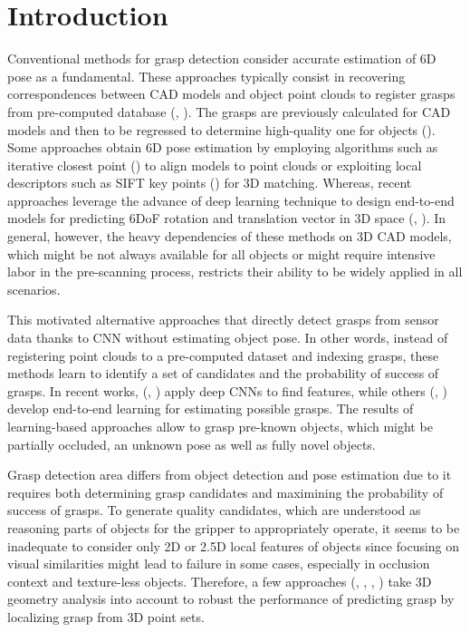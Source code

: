 \section{Introduction}
\label{sec:intro}
Conventional methods for grasp detection consider accurate estimation of 6D pose as a fundamental. These approaches typically consist in recovering correspondences between CAD models and object point clouds to register grasps from pre-computed database (\textcolor{cyan}{\cite{munoz2016fast}}, \textcolor{cyan}{\cite{zeng2017multi}}). The grasps are previously calculated for CAD models and then to be regressed to determine high-quality one for objects (\textcolor{cyan}{\cite{bohg2013data}}). Some approaches obtain 6D pose estimation by employing algorithms such as iterative closest point (\textcolor{cyan}{\cite{besl1992method}}) to align models to point clouds or exploiting local descriptors such as SIFT key points (\textcolor{cyan}{\cite{dias2014sift}}) for 3D matching. Whereas, recent approaches leverage the advance of deep learning technique to design end-to-end models for predicting 6DoF rotation and translation vector in 3D space (\textcolor{cyan}{\cite{wu20196d}}, \textcolor{cyan}{\cite{wang2019densefusion}}). In general, however, the heavy dependencies of these methods on 3D CAD models, which might be not always available for all objects or might require intensive labor in the pre-scanning process, restricts their ability to be widely applied in all scenarios.

This motivated alternative approaches that directly detect grasps from sensor data thanks to CNN without estimating object pose. In other words, instead of registering point clouds to a pre-computed dataset and indexing grasps, these methods learn to identify a set of candidates and the probability of success of grasps. In recent works, (\textcolor{cyan}{\cite{mahler2017dex}}, \textcolor{cyan}{\cite{mahler2018dex}}) apply deep CNNs to find features, while others (\textcolor{cyan}{\cite{redmon2015real}}, \textcolor{cyan}{\cite{lenz2015deep}}) develop end-to-end learning for estimating possible grasps. The results of learning-based approaches allow to grasp pre-known objects, which might be partially occluded, an unknown pose as well as fully novel objects.

Grasp detection area differs from object detection and pose estimation due to it requires both determining grasp candidates and maximining the probability of success of grasps. To generate quality candidates, which are understood as reasoning parts of objects for the gripper to appropriately operate, it seems to be inadequate to consider only 2D or 2.5D local features of objects since focusing on visual similarities might lead to failure in some cases, especially in occlusion context and texture-less objects. Therefore, a few approaches (\textcolor{cyan}{\cite{ten2017grasp}}, \textcolor{cyan}{\cite{mousavian20196}}, \textcolor{cyan}{\cite{liang2019pointnetgpd}}, \textcolor{cyan}{\cite{fang2020graspnet}}) take 3D geometry analysis into account to robust the performance of predicting grasp by localizing grasp from 3D point sets.

